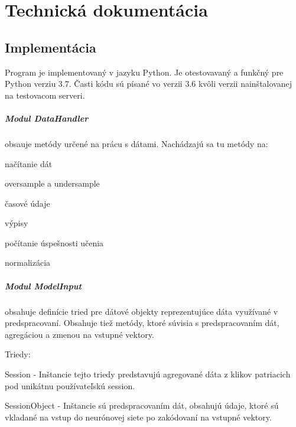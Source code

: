 
\chapter{Technická dokumentácia}
\label{technicka_dokumentacia}
\section{Implementácia}

Program je implementovaný v jazyku Python. Je otestovavaný a funkčný pre Python verziu 3.7. Časti kódu sú písané vo verzii 3.6 kvôli verzii nainštalovanej na testovacom serveri.

\paragraph{Modul DataHandler}
obsauje metódy určené na prácu s dátami. Nachádzajú sa tu metódy na:
\begin{my_itemize}
	\item{načítanie dát}
	\item{oversample a undersample}
	\item{časové údaje}
	\item{výpisy}
	\item{počítanie úspešnosti učenia}
	\item{normalizácia}
\end{my_itemize} 

\paragraph{Modul ModelInput}
obsahuje definície tried pre dátové objekty reprezentujúce dáta využívané v predspracovaní. Obsahuje tiež metódy, ktoré súvisia s predspracovaním dát, agregáciou a zmenou na vstupné vektory.

Triedy:
\begin{my_itemize}
	\item{Session} - Inštancie tejto triedy predstavujú agregované dáta z klikov patriacich pod unikátnu používateľskú session.
	\item{SessionObject} - Inštancie sú predspracovaním dát, obsahujú údaje, ktoré sú vkladané na vstup do neurónovej siete po zakódovaní na vstupné vektory.
\end{my_itemize}

